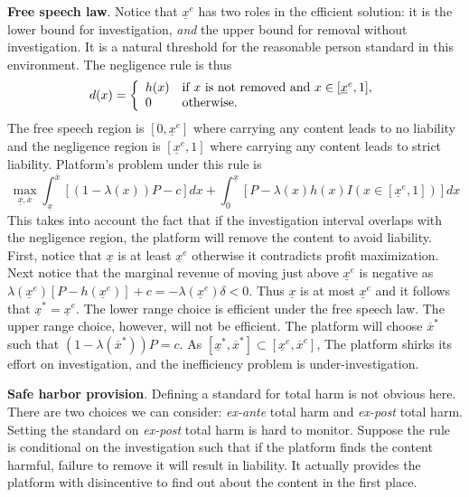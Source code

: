 \textbf{Free speech law}.
Notice that $\underline{x}^e$ has two roles in the efficient solution: it is the lower bound for investigation, \emph{and} the upper bound for removal without investigation. It is a natural threshold for the reasonable person standard in this environment. The negligence rule is thus
\begin{equation}
d(x)=
\lt\{\begin{array}{ll}
    h(x) & \mbox{if $x$ is not removed and $x\in[\underline{x}^e,1]$}, \\ %
    0 & \mbox{otherwise}.
\end{array}\rt.
\end{equation}
The free speech region is $[0,\underline{x}^e]$ where carrying any content leads to no liability and the negligence region is $[\underline{x}^e,1]$ where carrying any content leads to strict liability. 
Platform's problem under this rule is 
\begin{equation}
    \max_{\underline{x},\overline{x}} \int_{\underline{x}}^{\overline{x}} [(1-\lambda(x))P-c]dx + \int_0^{\underline{x}} [P-\lambda(x)h(x)I(x\in[\underline{x}^e,1])]dx 
\end{equation}
This takes into account the fact that if the investigation interval overlaps with the negligence region, the platform will remove the content to avoid liability. First, notice that $\underline{x}$ is at least $\underline{x}^e$ otherwise it contradicts profit maximization. Next notice that the marginal revenue of moving just above $\underline{x}^e$ is negative as $\lambda(\underline{x}^e)[P-h(\underline{x}^e)]+c=-\lambda(\underline{x}^e)\delta<0$. Thus $\underline{x}$ is at most $\underline{x}^e$ and it follows that $\underline{x}^*=\underline{x}^e$. The lower range choice is efficient under the free speech law. The upper range choice, however, will not be efficient. The platform will choose $\overline{x}^*$ such that $(1-\lambda(\overline{x}^*))P=c$. As $[\underline{x}^*,\overline{x}^*]\subset[\underline{x}^e,\overline{x}^e]$, The platform shirks its effort on investigation, and the inefficiency problem is under-investigation.  


\textbf{Safe harbor provision}.
Defining a standard for total harm is not obvious here. There are two choices we can consider: \emph{ex-ante} total harm and \emph{ex-post} total harm.
Setting the standard on \emph{ex-post} total harm is hard to monitor. Suppose the rule is conditional on the investigation such that if the platform finds the content harmful, failure to remove it will result in liability. It actually provides the platform with disincentive to find out about the content in the first place.  

